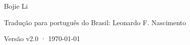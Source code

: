 \begin{titlepage}
\vfill
{\LARGE\sffamily Bojie Li\par}
\vspace{0.3cm}
{\normalsize\sffamily\color{structurecolor!80} Tradução para português do Brasil: Leonardo F. Nascimento\par}
\vspace{0.7cm}
{\small\sffamily\color{structurecolor!80} Versão v2.0 · \today\par}
\vspace{1.2cm}
\end{titlepage}
